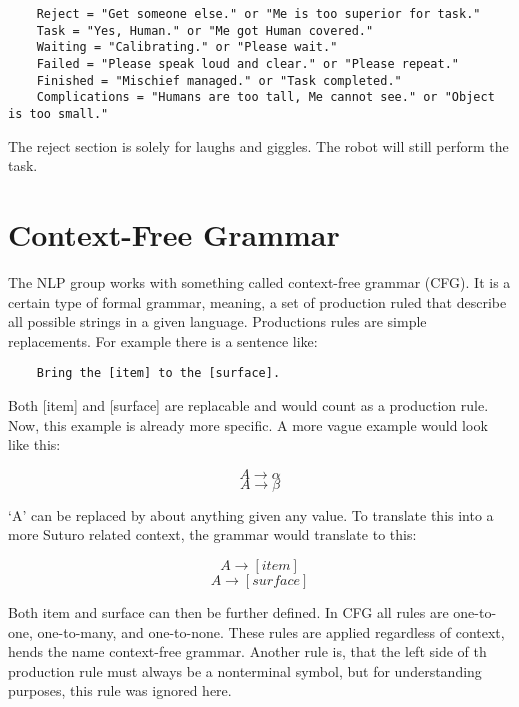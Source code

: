 \documentclass[main.tex]{subfiles}
\begin{document}
	\begin{verbatim}
	Reject = "Get someone else." or "Me is too superior for task."
	Task = "Yes, Human." or "Me got Human covered."
	Waiting = "Calibrating." or "Please wait."
	Failed = "Please speak loud and clear." or "Please repeat."
	Finished = "Mischief managed." or "Task completed."
	Complications = "Humans are too tall, Me cannot see." or "Object is too small."
	\end{verbatim}
	
	The reject section is solely for laughs and giggles. The robot will still perform the task.
	
	\section{Context-Free Grammar}
	The NLP group works with something called context-free grammar (CFG). It is a certain type of formal grammar, meaning, a set of production ruled that describe all possible strings in a given language. Productions rules are simple replacements. For example there is a sentence like:

	\begin{verbatim}
	Bring the [item] to the [surface].
	\end{verbatim}
	
	Both [item] and [surface] are replacable and would count as a production rule. Now, this example is already more specific. A more vague example would look like this:
	
	\begin{equation}
	A \rightarrow \alpha
	\end{equation}
	\begin{equation}
	A \rightarrow \beta
	\end{equation}
	
	‘A’ can be replaced by about anything given any value. To translate this into a more Suturo related context, the grammar would translate to this:
	
	\begin{equation}
	A \rightarrow [item]
	\end{equation}
	\begin{equation}
	A \rightarrow [surface]
	\end{equation}

	Both item and surface can then be further defined. In CFG all rules are one-to-one, one-to-many, and one-to-none. These rules are applied regardless of context, hends the name context-free grammar. Another rule is, that the left side of th production rule must always be a nonterminal symbol, but for understanding purposes, this rule was ignored here.
\end{document}
